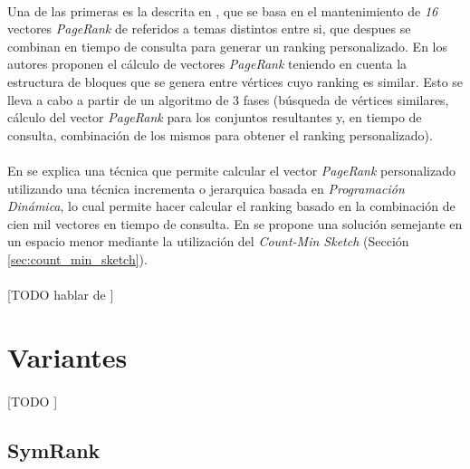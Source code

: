 \documentclass{subfiles}
\begin{document}
      \paragraph{}
      Una de las primeras es la descrita en \cite{haveliwala2002topic}, que se basa en el mantenimiento de \emph{16} vectores \emph{PageRank} de referidos a temas distintos entre si, que despues se combinan en tiempo de consulta para generar un ranking personalizado. En \cite{kamvar2003exploiting} los autores proponen el cálculo de vectores \emph{PageRank} teniendo en cuenta la estructura de bloques que se genera entre vértices cuyo ranking es similar. Esto se lleva a cabo a partir de un algoritmo de 3 fases (búsqueda de vértices similares, cálculo del vector \emph{PageRank} para los conjuntos resultantes y, en tiempo de consulta, combinación de los mismos para obtener el ranking personalizado).

      \paragraph{}
      En \cite{jeh2003scaling} se explica una técnica que permite calcular el vector \emph{PageRank} personalizado utilizando una técnica incrementa o jerarquica basada en \emph{Programación Dinámica}, lo cual permite hacer calcular el ranking basado en la combinación de cien mil vectores en tiempo de consulta. En \cite{sarlos2006randomize} se propone una solución semejante en un espacio menor mediante la utilización del \emph{Count-Min Sketch} (Sección \ref{sec:count_min_sketch}).

      \paragraph{}
      [TODO hablar de \cite{sarma2011estimating}]

    \section{Variantes}
    \label{sec:pagerank_variants}

      \paragraph{}
      [TODO ]

      \subsection{SymRank}
      \label{sec:symrank}
\end{document}
